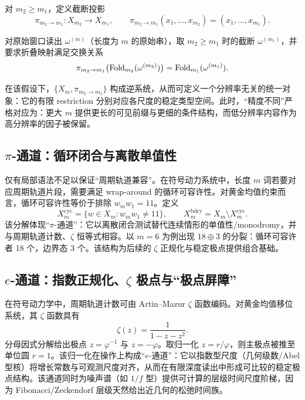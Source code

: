 \begin{definition}[restriction 投影]\label{def:resfold-pi}
对 $m_2\ge m_1$，定义截断投影
\[
\pi_{m_2\to m_1}:X_{m_2}\to X_{m_1},\qquad
\pi_{m_2\to m_1}(x_1,\dots,x_{m_2})=(x_1,\dots,x_{m_1}).
\]
\end{definition}

\begin{assumption}\label{assump:resfold-factorization}
对原始窗口读出 $\omega^{(m)}$（长度为 $m$ 的原始串），取 $m_2\ge m_1$ 时的截断 $\omega^{(m_1)}$，并要求折叠映射满足交换关系
\[
\pi_{m_2\to m_1}\bigl(\mathrm{Fold}_{m_2}(\omega^{(m_2)})\bigr)=\mathrm{Fold}_{m_1}(\omega^{(m_1)}).
\]
\end{assumption}

在该假设下，$\{X_m,\pi_{m_2\to m_1}\}$ 构成逆系统，从而可定义一个分辨率无关的统一对象：它的有限 restriction 分别对应各尺度的稳定类型空间。此时，“精度不同”严格对应为：更大 $m$ 提供更长的可见前缀与更细的条件结构，而低分辨率内容作为高分辨率的因子被保留。

\subsection{\texorpdfstring{$\pi$}{pi}-通道：循环闭合与离散单值性}

仅有局部语法不足以保证“周期轨道兼容”。在符号动力系统中，长度 $m$ 词若要对应周期轨道片段，需要满足 wrap-around 的循环可容许性。对黄金均值约束而言，循环可容许性等价于排除 $w_mw_1=11$。定义
\[
X_m^{\mathrm{cyc}}=\{w\in X_m: w_mw_1\neq 11\},\qquad
X_m^{\mathrm{bdry}}=X_m\setminus X_m^{\mathrm{cyc}}.
\]
该分解体现“$\pi$-通道”：它以离散闭合测试替代连续情形的单值性/monodromy，并与周期轨道计数、$\zeta$ 恒等式相容。以 $m=6$ 为例出现 $18\oplus 3$ 的分裂：循环可容许者 18 个，边界态 3 个。该结构为后续的 $\zeta$ 正规化与稳定极点提供组合基础。

\subsection{\texorpdfstring{$e$}{e}-通道：指数正规化、\texorpdfstring{$\zeta$}{zeta} 极点与“极点屏障”}

在符号动力学中，周期轨道计数可由 Artin--Mazur $\zeta$ 函数编码。对黄金均值移位系统，其 $\zeta$ 函数具有
\[
\zeta(z)=\frac{1}{1-z-z^2}.
\]
分母因式分解给出极点 $z=\varphi^{-1}$ 与 $z=-\varphi$。取归一化 $z=r/\varphi$，则主极点被推至单位圆 $r=1$。该归一化在操作上构成“$e$-通道”：它以指数型尺度（几何级数/Abel 型核）将增长常数与可观测尺度对齐，从而在有限深度读出中形成可比较的稳定极点结构。该通道同时为噪声谱（如 $1/f$ 型）提供可计算的层级时间尺度阶梯，因为 Fibonacci/Zeckendorf 层级天然给出近几何的松弛时间族。

